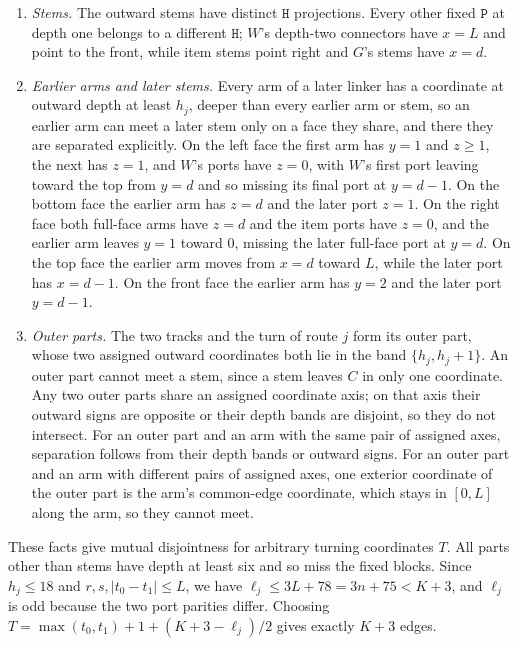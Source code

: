 \documentclass[11pt,letterpaper]{article}
\theoremstyle{definition}
\theoremstyle{remark}
\newcommand{\Hh}{\mathtt{H}}
\newcommand{\Pp}{\mathtt{P}}
\begin{document}
\begin{enumerate}[label=(\roman*)]
  \item \emph{Stems.} The outward stems have distinct $\Hh$ projections. Every other fixed $\Pp$ at
    depth one belongs to a different $\Hh$; $W$'s depth-two connectors have $x=L$ and point to the
    front, while item stems point right and $G$'s stems have $x=d$.
  \item \emph{Earlier arms and later stems.} Every arm of a later linker has a coordinate at outward
    depth at least $h_j$, deeper than every earlier arm or stem, so an earlier arm can meet a later
    stem only on a face they share, and there they are separated explicitly. On the left face the
    first arm has $y=1$ and $z\ge1$, the next has $z=1$, and $W$'s ports have $z=0$, with $W$'s first
    port leaving toward the top from $y=d$ and so missing its final port at $y=d-1$. On the bottom face
    the earlier arm has $z=d$ and the later port $z=1$. On the right face both full-face arms have
    $z=d$ and the item ports have $z=0$, and the earlier arm leaves $y=1$ toward $0$, missing the later
    full-face port at $y=d$. On the top face the earlier arm moves from $x=d$ toward $L$, while the later
    port has $x=d-1$. On the front face the earlier arm has $y=2$ and the later port $y=d-1$.
  \item \emph{Outer parts.} The two tracks and the turn of route $j$ form its outer part, whose two
    assigned outward coordinates both lie in the band $\{h_j,h_j+1\}$. An outer part cannot meet a
    stem, since a stem leaves $C$ in only one coordinate. Any two outer parts share an assigned
    coordinate axis; on that axis their outward signs are opposite or their depth bands are disjoint,
    so they do not intersect. For an outer part and an arm with the same pair of assigned axes,
    separation follows from their depth bands or outward signs. For an outer part and an arm with
    different pairs of assigned axes, one exterior coordinate of the outer part is the arm's
    common-edge coordinate, which stays in $[0,L]$ along the arm, so they cannot meet.
\end{enumerate}
These facts give mutual disjointness for arbitrary turning coordinates $T$. All parts other than
stems have depth at least six and so miss the fixed blocks. Since $h_j\le18$ and $r,s,|t_0-t_1|\le L$,
we have $\ell_j\le 3L+78=3n+75<K+3$, and $\ell_j$ is odd because the two port parities differ.
Choosing $T=\max(t_0,t_1)+1+(K+3-\ell_j)/2$ gives exactly $K+3$ edges.
\end{document}
